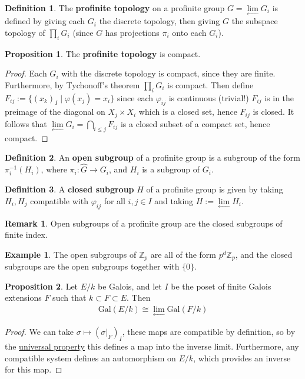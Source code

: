 \documentclass[11pt]{article}
\theoremstyle{definition}
\newtheorem{defn}{Definition}
\newtheorem{prop}{Proposition}
\newtheorem*{rmk}{Remark}
\newtheorem{eg}{Example}
\newcommand{\set}[1]{\{#1\}}
\newcommand{\gal}{\text{Gal}}
\newcommand{\invlim}{\lim\limits_{\longleftarrow}}
\begin{document}
    \begin{defn}
        The \textbf{profinite topology} on a profinite group \(G = \invlim G_i\) is defined by giving each \(G_i\) the discrete topology, then giving \(G\) the subspace topology of \(\prod_i G_i\) (since \(G\) has projections \(\pi_i\) onto each \(G_i\)).
    \end{defn}
    \begin{prop}
        The \textbf{profinite topology} is compact.
        \begin{proof}
            Each \(G_i\) with the discrete topology is compact, since they are finite. Furthermore, by Tychonoff's theorem \(\prod_i G_i\) is compact. Then define \(F_{ij} := \set{(x_k)_I \mid \varphi(x_j) = x_i}\) since each \(\varphi_{ij}\) is continuous (trivial!) \(F_{ij}\) is in the preimage of the diagonal on \(X_j \times X_i\) which is a closed set, hence \(F_{ij}\) is closed. It follows that \(\invlim G_i = \bigcap_{i \leq j} F_{ij}\) is a closed subset of a compact set, hence compact.
        \end{proof}
    \end{prop}
    \begin{defn}
        An \textbf{open subgroup} of a profinite group is a subgroup of the form \(\pi_i^{-1}(H_i)\), where \(\pi_i: \hat{G} \to G_i\), and \(H_i\) is a subgroup of \(G_i\).
    \end{defn}
    \begin{defn}
        A \textbf{closed subgroup} \(H\) of a profinite group is given by taking \(H_i, H_j\) compatible with \(\varphi_{ij}\) for all \(i,j \in I\) and taking \(H := \invlim H_i\).
    \end{defn}
    \begin{rmk}
        Open subgroups of a profinite group are the closed subgroups of finite index.
    \end{rmk}
    \begin{eg}
        The open subgroups of \(\mathbb{Z}_p\) are all of the form \(p^d \mathbb{Z}_p\), and the closed subgroups are the open subgroups together with \(\set{0}\).
    \end{eg}
    \begin{prop}\label{galoisinv}
        Let \(E/k\) be Galois, and let \(I\) be the poset of finite Galois extensions \(F\) such that \(k \subset F \subset E\). Then
        \begin{align*}
            \gal(E/k) \cong \invlim \gal(F/k)
        \end{align*}
        \begin{proof}
            We can take \(\sigma \mapsto (\sigma\vert_F)_I\), these maps are compatible by definition, so by the \hyperref[invuniv]{universal property} this defines a map into the inverse limit. Furthermore, any compatible system defines an automorphism on \(E/k\), which provides an inverse for this map.
        \end{proof}
    \end{prop}
\end{document}
